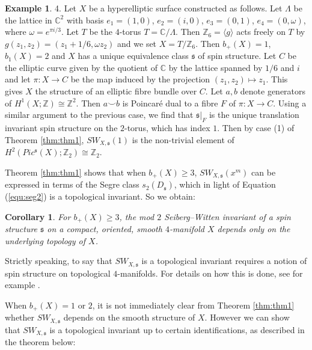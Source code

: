 \documentclass{amsart}
\newtheorem{corollary}[theorem]{Corollary}
\theoremstyle{definition}
\newtheorem{example}[theorem]{Example}
\theoremstyle{remark}
\numberwithin{equation}{section}
\begin{document}
\begin{example}
4. Let $X$ be a hyperelliptic surface constructed as follows. Let $\Lambda$ be the lattice in $\mathbb{C}^2$ with basis $e_1 = (1,0)$, $e_2 = (i,0)$, $e_3 = (0,1)$, $e_4 = (0,\omega)$, where $\omega = e^{\pi i/3}$. Let $T$ be the $4$-torus $T = \mathbb{C}/\Lambda$. Then $\mathbb{Z}_6 = \langle g \rangle$ acts freely on $T$ by $g(z_1, z_2) = (z_1 + 1/6 , \omega z_2)$ and we set $X = T/\mathbb{Z}_6$. Then $b_+(X) = 1$, $b_1(X) = 2$ and $X$ has a unique equivalence class $\mathfrak{s}$ of spin structure. Let $C$ be the elliptic curve given by the quotient of $\mathbb{C}$ by the lattice spanned by $1/6$ and $i$ and let $\pi : X \to C$ be the map induced by the projection $(z_1,z_2) \mapsto z_1$. This gives $X$ the structure of an elliptic fibre bundle over $C$. Let $a,b$ denote generators of $H^1(X ; \mathbb{Z}) \cong \mathbb{Z}^2$. Then $a \smallsmile b$ is Poincar\'e dual to a fibre $F$ of $\pi : X \to C$. Using a similar argument to the previous case, we find that $\mathfrak{s}|_F$ is the unique translation invariant spin structure on the $2$-torus, which has index $1$. Then by case (1) of Theorem \ref{thm:thm1}, $SW_{X,\mathfrak{s}}(1)$ is the non-trivial element of $H^2( Pic^{\mathfrak{s}}(X) ; \mathbb{Z}_2) \cong \mathbb{Z}_2$.

\end{example}

Theorem \ref{thm:thm1} shows that when $b_+(X) \ge 3$, $SW_{X,\mathfrak{s}}(x^m)$ can be expressed in terms of the Segre class $s_{2}(D_{\mathfrak{s}})$, which in light of Equation (\ref{equ:seg2}) is a topological invariant. So we obtain:

\begin{corollary}
For $b_+(X) \ge 3$, the mod $2$ Seiberg--Witten invariant of a spin structure $\mathfrak{s}$ on a compact, oriented, smooth $4$-manifold $X$ depends only on the underlying topology of $X$.
\end{corollary}

Strictly speaking, to say that $SW_{X,\mathfrak{s}}$ is a topological invariant requires a notion of spin structure on topological $4$-manifolds. For details on how this is done, see for example \cite[]{bk}.

When $b_+(X) = 1$ or $2$, it is not immediately clear from Theorem \ref{thm:thm1} whether $SW_{X, \mathfrak{s}}$ depends on the smooth structure of $X$. However we can show that $SW_{X , \mathfrak{s}}$ is a topological invariant up to certain identifications, as described in the theorem below:
\end{document}

